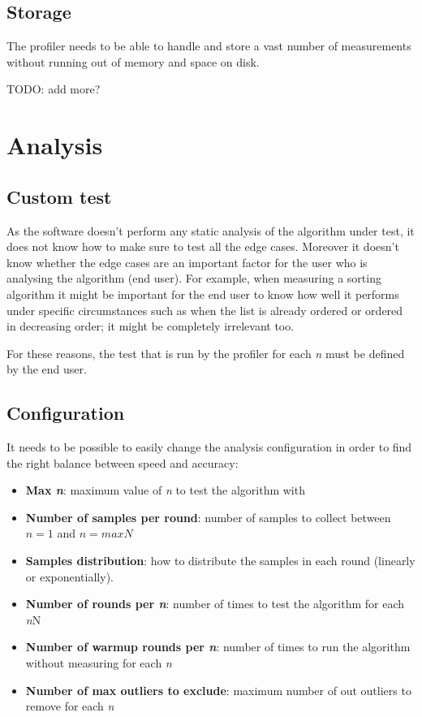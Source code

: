 \subsection{Storage}
The profiler needs to be able to handle and store a vast number of measurements without running out of memory and space on disk.


TODO: add more?

\section{Analysis}

\subsection{Custom test}
As the software doesn't perform any static analysis of the algorithm under test, it does not know how to make sure to test all the edge cases. Moreover it doesn't know whether the edge cases are an important factor for the user who is analysing the algorithm (end user). \noindent For example, when measuring a sorting algorithm it might be important for the end user to know how well it performs under specific circumstances such as when the list is already ordered or ordered in decreasing order; it might be completely irrelevant too.

\noindent For these reasons, the test that is run by the profiler for each \emph{n} must be defined by the end user.

\subsection{Configuration}
It needs to be possible to easily change the analysis configuration in order to find the right balance between speed and accuracy:
\begin{itemize}
  \item \textbf{Max \emph{n}}: maximum value of \emph{n} to test the algorithm with
  \item \textbf{Number of samples per round}: number of samples to collect between $n = 1$ and $n = maxN$
  \item \textbf{Samples distribution}: how to distribute the samples in each round (linearly or exponentially).
  \item \textbf{Number of rounds per \emph{n}}: number of times to test the algorithm for each \emph{n}N
  \item \textbf{Number of warmup rounds per \emph{n}}: number of times to run the algorithm without measuring for each \emph{n}
  \item \textbf{Number of max outliers to exclude}: maximum number of out outliers to remove for each \emph{n}
\end{itemize}


